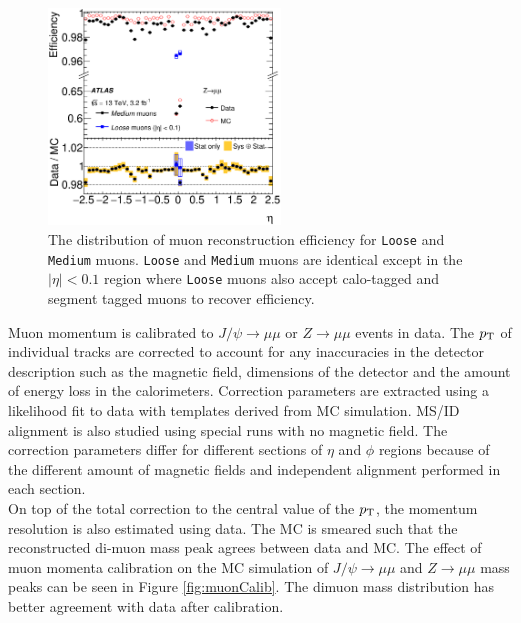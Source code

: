 \begin{figure}[h!]
  \begin{center}
    \includegraphics[width=0.55\textwidth]{figures/MuonReco/MuonEff.eps}
\end{center}
\caption[The muon reconstruction efficiency distribution for {\tt Loose} and {\tt Medium} muons]{The distribution of muon reconstruction efficiency for {\tt Loose} and {\tt Medium} muons.\cite{MuonReco}  {\tt Loose} and {\tt Medium} muons are identical except in the $|\eta| < 0.1$ region where {\tt Loose} muons also accept calo-tagged and segment tagged muons to recover efficiency.}
\label{fig:muoneff} 
\end{figure}

\indent Muon momentum is calibrated to $J/\psi\rightarrow \mu\mu$ or $Z\rightarrow\mu\mu$ events in data.  The $p_{\mathrm{T}}$ of individual tracks are corrected to account for any inaccuracies in the detector description such as the magnetic field, dimensions of the detector and the amount of energy loss in the calorimeters.  Correction parameters are extracted using a likelihood fit to data with templates derived from MC simulation. MS/ID alignment is also studied using special runs with no magnetic field. The correction parameters differ for different sections of $\eta$ and $\phi$ regions because of the different amount of magnetic fields and independent alignment performed in each section. \\

\indent On top of the total correction to the central value of the $p_{\mathrm{T}}$, the momentum resolution is also estimated using data.  The MC is smeared such that the reconstructed di-muon mass peak agrees between data and MC. The effect of muon momenta calibration on the MC simulation of $J/\psi\rightarrow \mu\mu$ and $Z\rightarrow\mu\mu$ mass peaks can be seen in Figure \ref{fig:muonCalib}. The dimuon mass distribution has better agreement with data  after calibration.  \\%


